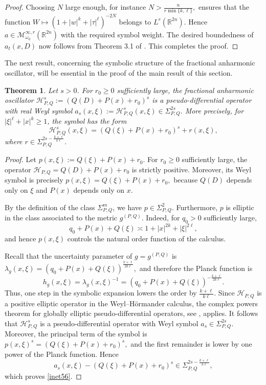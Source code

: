 \documentclass[12pt, reqno]{amsart}
\newcommand{\M}{\mathcal{M}}
\newtheorem{theorem}{Theorem}[section]
\theoremstyle{definition}
\theoremstyle{remark}
\numberwithin{equation}{section}
\begin{document}
\begin{proof}
Choosing $N$ large enough, for instance $N>\frac{n}{r\min\{k,\ell\}},$
ensures that the function $W\mapsto (1+|w|^k+|\tau|^\ell)^{-2N}$
belongs to $L^r(\mathbb{R}^{2n})$. Hence $a\in \M_{\omega_0}^{\infty,r}(\mathbb{R}^{2n})$
with the required symbol weight. The desired boundedness of $a_t(x,D)$ now follows from Theorem 3.1 of \cite{toft1:mod}. This completes the proof.
\end{proof}


The next result, concerning the symbolic structure of the fractional anharmonic oscillator, will be essential in the proof of the main result of this section.

\begin{theorem}\label{regansymb}
Let $s>0$. For $r_0\geq0$ sufficiently large, the fractional anharmonic oscillator $\mathcal{H}_{P,Q}^s:=(Q(D)+P(x)+r_0)^s$
is a pseudo-differential operator with real Weyl symbol $a_s(x,\xi):=\mathcal{H}_{P,Q}^s(x,\xi)\in \Sigma_{P,Q}^{2s}.$
More precisely, for $|\xi|^\ell+|x|^k\geq 1$, the symbol has the form
\begin{equation}\label{inet56}
\mathcal{H}_{P,Q}^s(x,\xi)
=
(Q(\xi)+P(x)+r_0)^s+r(x,\xi),
\end{equation}
where $r\in \Sigma_{P,Q}^{2s-\frac{k+\ell}{k\ell}}.$
\end{theorem}

\begin{proof}
Let $p(x,\xi):=Q(\xi)+P(x)+r_0.$
For $r_0\geq0$ sufficiently large, the operator $\mathcal H_{P,Q}=Q(D)+P(x)+r_0$
is strictly positive. Moreover, its Weyl symbol is precisely $p(x,\xi)=Q(\xi)+P(x)+r_0,$
because $Q(D)$ depends only on $\xi$ and $P(x)$ depends only on $x$.

By the definition of the class $\Sigma_{P,Q}^{m}$, we have $p\in \Sigma_{P,Q}^{2}.$
Furthermore, $p$ is elliptic in the class associated to the metric $g^{(P,Q)}$. Indeed, for $q_0>0$ sufficiently large,
\[
q_0+P(x)+Q(\xi)
\asymp
1+|x|^{2k}+|\xi|^{2\ell},
\]
and hence $p(x,\xi)$ controls the natural order function of the calculus.

Recall that the uncertainty parameter of $g=g^{(P,Q)}$ is $\lambda_g(x,\xi)
=
(q_0+P(x)+Q(\xi))^{\frac{k+\ell}{2k\ell}},$
and therefore the Planck function is
\[
h_g(x,\xi)
=
\lambda_g(x,\xi)^{-1}
=
(q_0+P(x)+Q(\xi))^{-\frac{k+\ell}{2k\ell}}.
\]
Thus, one step in the symbolic expansion lowers the order by $\frac{k+\ell}{k\ell}.$ Since $\mathcal H_{P,Q}$ is a positive elliptic operator in the Weyl--H\"ormander calculus, the complex powers theorem for globally elliptic pseudo-differential operators, see \cite[Theorem 4.3.6]{NicolaRodino}, applies. It follows that $\mathcal H_{P,Q}^s$
is a pseudo-differential operator with Weyl symbol $a_s\in \Sigma_{P,Q}^{2s}.$
Moreover, the principal term of the symbol is $p(x,\xi)^s=(Q(\xi)+P(x)+r_0)^s,$
and the first remainder is lower by one power of the Planck function. Hence
\[
a_s(x,\xi)
-
(Q(\xi)+P(x)+r_0)^s
\in
\Sigma_{P,Q}^{2s-\frac{k+\ell}{k\ell}},
\]
which proves \eqref{inet56}.
\end{proof}
\end{document}
